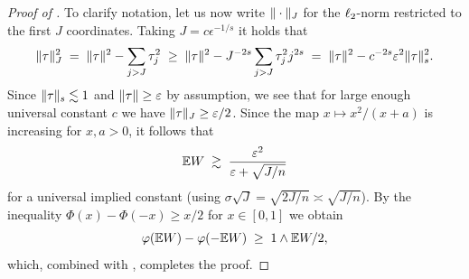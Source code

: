 \begin{proof}[Proof of ]
To clarify notation, let us now write $\Vert \cdot \Vert_J$ for the $\ell_2$-norm restricted to
the first $J$ coordinates. Taking $J = c \epsilon^{-1/s}$ it holds that
\[
  \Vert \tau \Vert_J^2 \;=\; \Vert \tau \Vert^2 - \sum_{j > J}\tau_j^2
   \;\geq\; \Vert \tau \Vert^2 - J^{-2s}\sum_{j > J}\tau_j^2 j^{2s}
   \;=\; \Vert \tau \Vert^2 - c^{-2s}\varepsilon^2 \Vert \tau \Vert_s^2.
\]
Since $\Vert \tau \Vert_s \lesssim 1$ and $\Vert \tau \Vert \geq \varepsilon$ by assumption, we see
that for large enough universal constant $c$ we have $\Vert \tau \Vert_J \geq \varepsilon/2$.
Since the map $x \mapsto x^2/(x + a)$ is increasing for $x, a > 0$, it follows that
\[
  \mathbb{E} W \;\gtrsim\; \frac{\varepsilon^2}{\varepsilon + \sqrt{J/n}}
\]
for a universal implied constant (using $\sigma\sqrt{J} = \sqrt{2J/n}\asymp\sqrt{J/n}$).
By the inequality $\Phi(x) - \Phi(-x) \geq x/2$ for $x \in [0,1]$ we obtain
\[
  \varphi(\mathbb{E} W) - \varphi(-\mathbb{E} W) \;\geq\; 1 \wedge \mathbb{E} W/2,
\]
which, combined with , completes the proof.

\end{proof}

